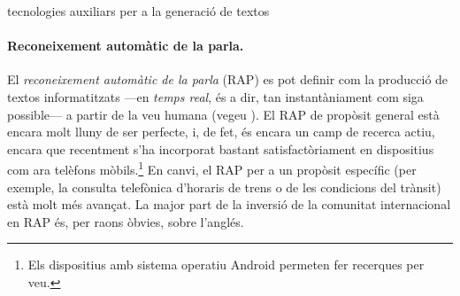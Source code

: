\begin{persabermes}{tecnologies auxiliars per a la generació de textos}
  \paragraph{Reconeixement automàtic de la parla.}
  El \emph{reconeixement automàtic de la parla} (RAP) es pot definir
  com la producció de textos informatitzats ---en \emph{temps real},
  és a dir, tan instantàniament com siga possible--- a partir de la
  veu humana (vegeu \citealt{samuelson-brown96b}). El RAP de propòsit
  general està encara molt lluny de ser perfecte, i, de fet, és encara
  un camp de recerca actiu, encara que recentment s'ha incorporat
  bastant satisfactòriament en dispositius com ara telèfons
  mòbils.\footnote{Els dispositius amb sistema operatiu Android
    permeten fer recerques per veu.} En canvi, el RAP per a un
  propòsit específic (per exemple, la consulta telefònica d'horaris de
  trens o de les condicions del trànsit) està molt més avançat. La
  major part de la inversió de la comunitat internacional en RAP és,
  per raons òbvies, sobre l'anglés.


\end{persabermes}

